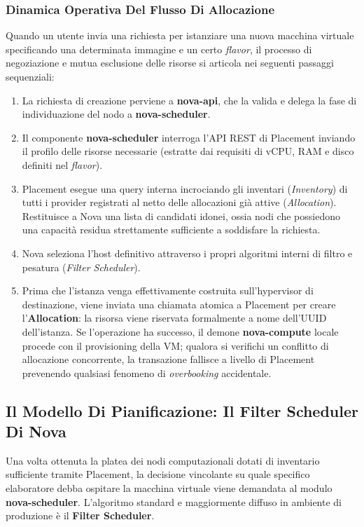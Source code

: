 \documentclass[11pt, a4paper]{article}
\begin{document}
\subsubsection{Dinamica Operativa Del Flusso Di Allocazione}

Quando un utente invia una richiesta per istanziare una nuova macchina virtuale specificando una determinata immagine e un certo \emph{flavor}, il processo di negoziazione e mutua esclusione delle risorse si articola nei seguenti passaggi sequenziali:

\begin{enumerate}
    \item La richiesta di creazione perviene a \textbf{nova-api}, che la valida e delega la fase di individuazione del nodo a \textbf{nova-scheduler}.
    \item Il componente \textbf{nova-scheduler} interroga l'API REST di Placement inviando il profilo delle risorse necessarie (estratte dai requisiti di vCPU, RAM e disco definiti nel \emph{flavor}).
    \item Placement esegue una query interna incrociando gli inventari (\emph{Inventory}) di tutti i provider registrati al netto delle allocazioni già attive (\emph{Allocation}). Restituisce a Nova una lista di candidati idonei, ossia nodi che possiedono una capacità residua strettamente sufficiente a soddisfare la richiesta.
    \item Nova seleziona l'host definitivo attraverso i propri algoritmi interni di filtro e pesatura (\emph{Filter Scheduler}).
    \item Prima che l'istanza venga effettivamente costruita sull'hypervisor di destinazione, viene inviata una chiamata atomica a Placement per creare l'\textbf{Allocation}: la risorsa viene riservata formalmente a nome dell'UUID dell'istanza. Se l'operazione ha successo, il demone \textbf{nova-compute} locale procede con il provisioning della VM; qualora si verifichi un conflitto di allocazione concorrente, la transazione fallisce a livello di Placement prevenendo qualsiasi fenomeno di \emph{overbooking} accidentale.
\end{enumerate}

\newpage

\subsection{Il Modello Di Pianificazione: Il Filter Scheduler Di Nova}

Una volta ottenuta la platea dei nodi computazionali dotati di inventario sufficiente tramite Placement, la decisione vincolante su quale specifico elaboratore debba ospitare la macchina virtuale viene demandata al modulo \textbf{nova-scheduler}. L'algoritmo standard e maggiormente diffuso in ambiente di produzione è il \textbf{Filter Scheduler}.
\end{document}
